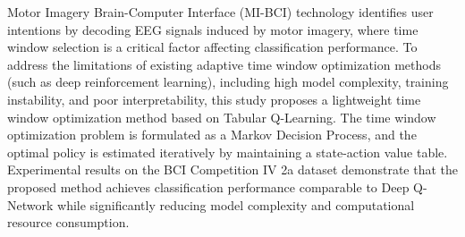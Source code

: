 
\begin{abstract}
运动想象脑机接口（Motor Imagery BCI）技术通过解码运动想象诱发的脑电信号识别用户意图，而时间窗选择是影响分类性能的关键因素。针对现有自适应时间窗优化方法（如深度强化学习）面临的模型复杂度高、训练不稳定、可解释性差等问题，本研究提出一种基于表格型 Q-Learning 的轻量化时间窗优化方法。本研究将时间窗优化问题建模为马尔可夫决策过程，通过维护状态 - 动作价值表迭代估计最优策略，在 BCI Competition IV 2a 数据集上的实验结果表明，所提方法在保持与深度 Q 网络相当分类性能的同时，显著降低了模型复杂度和计算资源消耗。

\end{abstract}

\begin{enabstract}
Motor Imagery Brain-Computer Interface (MI-BCI) technology identifies user intentions by decoding EEG signals induced by motor imagery, where time window selection is a critical factor affecting classification performance. To address the limitations of existing adaptive time window optimization methods (such as deep reinforcement learning), including high model complexity, training instability, and poor interpretability, this study proposes a lightweight time window optimization method based on Tabular Q-Learning. The time window optimization problem is formulated as a Markov Decision Process, and the optimal policy is estimated iteratively by maintaining a state-action value table. Experimental results on the BCI Competition IV 2a dataset demonstrate that the proposed method achieves classification performance comparable to Deep Q-Network while significantly reducing model complexity and computational resource consumption.

\end{enabstract}
